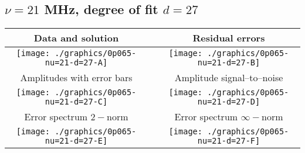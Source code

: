 

% 

\clearpage{}
\break{}

\subsection{$\nu = 21$ MHz, degree of fit $d = 27$}

\begin{table}[h]
    \begin{center}
        \begin{tabular}{ccc}
            Data and solution & \quad & Residual errors \\\hline
            \texttt{[image: ./graphics/0p065-nu=21-d=27-A]} &&
            \texttt{[image: ./graphics/0p065-nu=21-d=27-B]} \\[15pt]
            Amplitudes with error bars && Amplitude signal--to--noise \\\hline
            \texttt{[image: ./graphics/0p065-nu=21-d=27-C]} &&
            \texttt{[image: ./graphics/0p065-nu=21-d=27-D]} \\[15pt]
            Error spectrum $2-$norm && Error spectrum $\infty-$norm \\\hline
            \texttt{[image: ./graphics/0p065-nu=21-d=27-E]} &&
            \texttt{[image: ./graphics/0p065-nu=21-d=27-F]} \\[15pt]
        \end{tabular}
    \end{center}
\label{fig:elev=65, nu=21}
\end{table}



\endinput
